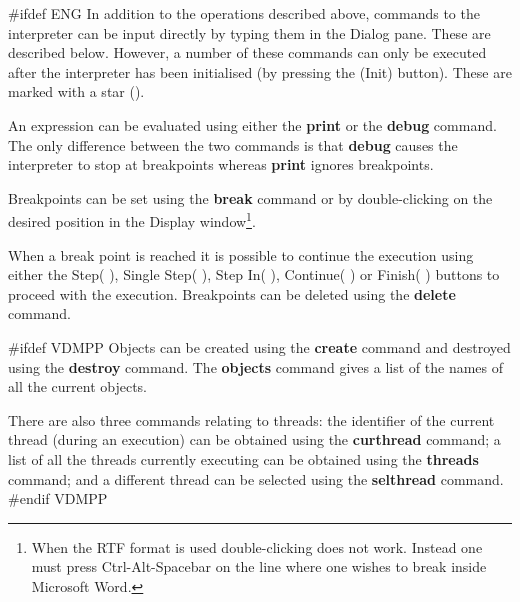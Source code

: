 \documentclass[\pformat,12pt]{article}
\newcommand{\guicmd}[1]{{\sf #1}}
\newcommand{\guicmd}[1]{{\gt #1}}
\begin{document}
#ifdef ENG
In addition to the operations described above, commands to the
interpreter can be input directly by typing them in the
\guicmd{Dialog} pane. These are described below. However, a number of
these commands can only be executed after the interpreter has
been initialised (by pressing the
(\guicmd{Init}) button).  These are
marked with a star ({\tt *}).

An expression can be evaluated using either the
\textbf{print} or the
\textbf{debug} command.  The only difference
between the two commands 
is that {\bf debug} causes the interpreter to stop at breakpoints
whereas {\bf print} ignores breakpoints.

Breakpoints can be set using the \textbf{break} command
 or by 
double-clicking on the desired position in the \guicmd{Display}
window\footnote{When the RTF format is used double-clicking does not
work. Instead one must press Ctrl-Alt-Spacebar on the line where one
wishes to break inside Microsoft Word.}.

When a break point is reached
it is possible to continue the execution using either the
\guicmd{Step}(\hspace{-1.8mm}
),
\guicmd{Single Step}(\hspace{-1.8mm} 
),
\guicmd{Step In}(\hspace{-1.8mm}
),
\guicmd{Continue}(\hspace{-1.8mm}
)
or \guicmd{Finish}(\hspace{-1.8mm} 
)
buttons to proceed with the execution. Breakpoints can be deleted
using the \textbf{delete} command. 

#ifdef VDMPP
Objects can be created using the \textbf{create} command
 and destroyed
using the \textbf{destroy} command. The
\textbf{objects} command gives 
a list of the names of all the current objects.

There are also three commands relating to threads: the identifier of
the current thread (during an execution) can be obtained using the
\textbf{curthread} command; a list of all
the threads currently executing can be obtained using the
\textbf{threads} command; and a 
different thread can be selected using the \textbf{selthread}
command.
#endif VDMPP
\end{document}
